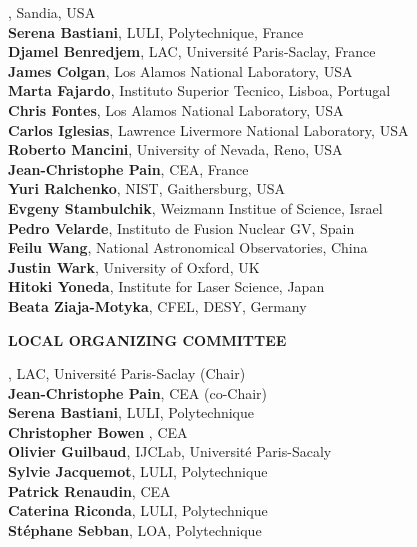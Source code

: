\documentclass[11pt,a4paper]{report}
\begin{document}
, Sandia, USA\\
{\bf Serena Bastiani}, LULI, Polytechnique, France\\
{\bf Djamel Benredjem}, LAC, Université Paris-Saclay, France\\
{\bf James Colgan}, Los Alamos National Laboratory, USA\\
{\bf Marta Fajardo}, Instituto Superior Tecnico, Lisboa, Portugal\\
{\bf Chris Fontes}, Los Alamos National Laboratory, USA\\
{\bf Carlos Iglesias}, Lawrence Livermore National Laboratory, USA\\
{\bf Roberto Mancini}, University of Nevada, Reno, USA\\
{\bf Jean-Christophe Pain}, CEA, France\\
{\bf Yuri Ralchenko}, NIST, Gaithersburg, USA\\
{\bf Evgeny Stambulchik}, Weizmann Institue of Science, Israel\\
{\bf Pedro Velarde}, Instituto de Fusion Nuclear GV, Spain\\
{\bf Feilu Wang}, National Astronomical Observatories, China\\
{\bf Justin Wark}, University of Oxford, UK\\
{\bf Hitoki Yoneda}, Institute for Laser Science, Japan\\
{\bf Beata Ziaja-Motyka}, CFEL, DESY, Germany
		
\par\vspace{.5cm}
\begin{Large}
	{\bf LOCAL ORGANIZING COMMITTEE}
\end{Large}

, LAC, Universit\'e Paris-Saclay (Chair)\\
{\bf Jean-Christophe Pain}, CEA (co-Chair)\\
{\bf Serena Bastiani}, LULI, Polytechnique\\
{\bf Christopher Bowen }, CEA\\
{\bf Olivier Guilbaud}, IJCLab, Universit\'e Paris-Sacaly\\
{\bf Sylvie Jacquemot}, LULI, Polytechnique\\
{\bf Patrick Renaudin}, CEA\\
{\bf Caterina Riconda}, LULI, Polytechnique\\
{\bf St\'ephane Sebban}, LOA, Polytechnique
		
\end{document}
